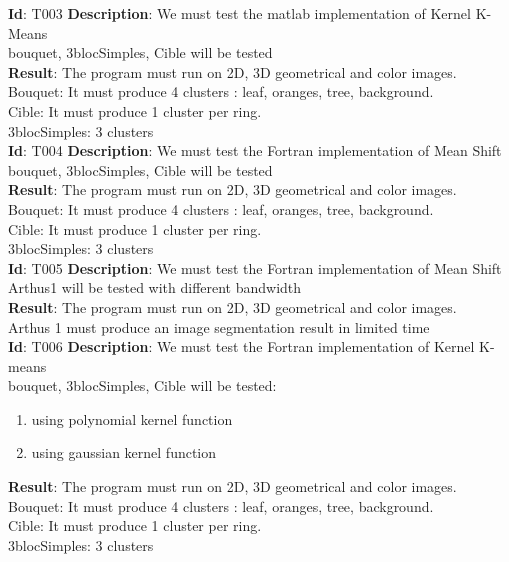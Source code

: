 \textbf{Id}: T003
\textbf{Description}: We must test the matlab implementation of Kernel K-Means \\
bouquet, 3blocSimples, Cible will be tested\\
\textbf{Result}: The program must run on 2D, 3D geometrical and color images. \\
Bouquet: It must produce 4 clusters : leaf, oranges, tree, background.\\
Cible: It must produce 1 cluster per ring.\\
3blocSimples: 3 clusters\\

\textbf{Id}: T004
\textbf{Description}: We must test the Fortran implementation of Mean Shift \\
bouquet, 3blocSimples, Cible will be tested\\
\textbf{Result}: The program must run on 2D, 3D geometrical and color images. \\
Bouquet: It must produce 4 clusters : leaf, oranges, tree, background.\\
Cible: It must produce 1 cluster per ring.\\
3blocSimples: 3 clusters\\

\textbf{Id}: T005
\textbf{Description}: We must test the Fortran implementation of Mean Shift \\
Arthus1 will be tested with different bandwidth\\
\textbf{Result}: The program must run on 2D, 3D geometrical and color images. \\
Arthus 1 must produce an image segmentation result in limited time\\

\textbf{Id}: T006
\textbf{Description}: We must test the Fortran implementation of Kernel K-means \\
bouquet, 3blocSimples, Cible will be tested: 
\begin{enumerate}
\item using polynomial kernel function
\item using gaussian kernel function
\end{enumerate}
\textbf{Result}: The program must run on 2D, 3D geometrical and color images. \\
Bouquet: It must produce 4 clusters : leaf, oranges, tree, background.\\
Cible: It must produce 1 cluster per ring.\\
3blocSimples: 3 clusters\\

